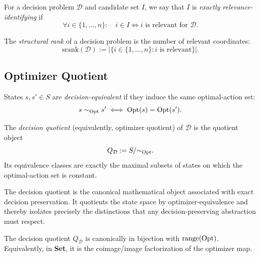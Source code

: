 \begin{definition}\label{def:exact-identifiability}
For a decision problem $\mathcal{D}$ and candidate set $I$, we say that $I$ is \emph{exactly relevance-identifying} if
\[
\forall i \in \{1,\ldots,n\}:\quad i \in I \iff i \text{ is relevant for } \mathcal{D}.
\]
\end{definition}

\begin{definition}\label{def:srank}
The \emph{structural rank} of a decision problem is the number of relevant coordinates:
\[
\mathrm{srank}(\mathcal{D}) := \left|\{i \in \{1,\ldots,n\}: i \text{ is relevant}\}\right|.
\]
\end{definition}

\subsection{Optimizer Quotient}

\begin{definition}\label{def:decision-equiv}
States $s,s' \in S$ are \emph{decision-equivalent} if they induce the same optimal-action set:
\[
s \sim_{\mathrm{Opt}} s' \iff \mathrm{Opt}(s)=\mathrm{Opt}(s').
\]
\end{definition}

\begin{definition}\label{def:decision-quotient}
The \emph{decision quotient} (equivalently, optimizer quotient) of $\mathcal{D}$ is the quotient object
\[
Q_{\mathcal{D}} := S / {\sim_{\mathrm{Opt}}}.
\]
Its equivalence classes are exactly the maximal subsets of states on which the optimal-action set is constant.
\end{definition}

The decision quotient is the canonical mathematical object associated with exact decision preservation. It quotients the state space by optimizer-equivalence and thereby isolates precisely the distinctions that any decision-preserving abstraction must respect.

\begin{proposition}\label{prop:optimizer-coimage}
The decision quotient $Q_{\mathcal{D}}$ is canonically in bijection with $\operatorname{range}(\mathrm{Opt})$. Equivalently, in \textbf{Set}, it is the coimage/image factorization of the optimizer map.
\end{proposition}


